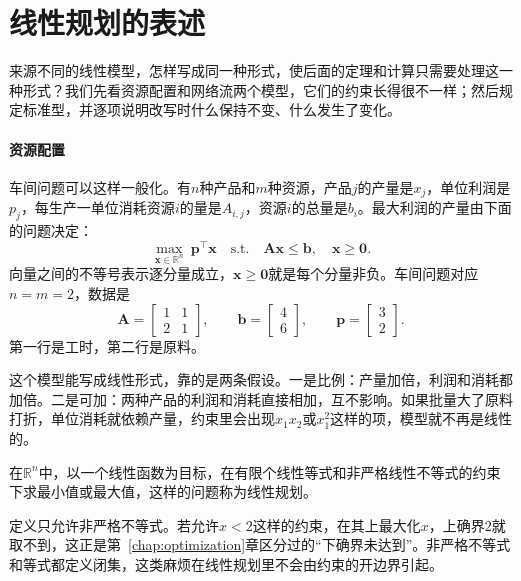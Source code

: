 \section{线性规划的表述}
\label{sec:lp-formulation}

来源不同的线性模型，怎样写成同一种形式，使后面的定理和计算只需要处理这一种形式？我们先看资源配置和网络流两个模型，它们的约束长得很不一样；然后规定标准型，并逐项说明改写时什么保持不变、什么发生了变化。

\paragraph{资源配置}
车间问题可以这样一般化。有$n$种产品和$m$种资源，产品$j$的产量是$x_j$，单位利润是$p_j$，每生产一单位消耗资源$i$的量是$A_{i,j}$，资源$i$的总量是$b_i$。最大利润的产量由下面的问题决定：
\begin{equation}
 \max_{\bm{x}\in\mathbb{R}^n}\ \bm{p}^\top\bm{x}
 \quad\text{s.t.}\quad \bm{A}\bm{x}\leq\bm{b},\quad \bm{x}\geq\bm{0}.
 \label{eq:lp-resource-general}
\end{equation}
向量之间的不等号表示逐分量成立，$\bm{x}\geq\bm{0}$就是每个分量非负。车间问题对应$n=m=2$，数据是
\begin{equation}
 \bm{A}=\begin{bmatrix}1&1\\2&1\end{bmatrix},\qquad
 \bm{b}=\begin{bmatrix}4\\6\end{bmatrix},\qquad
 \bm{p}=\begin{bmatrix}3\\2\end{bmatrix}.
 \label{eq:lp-workshop-inequality}
\end{equation}
第一行是工时，第二行是原料。

这个模型能写成线性形式，靠的是两条假设。一是比例：产量加倍，利润和消耗都加倍。二是可加：两种产品的利润和消耗直接相加，互不影响。如果批量大了原料打折，单位消耗就依赖产量，约束里会出现$x_1x_2$或$x_1^2$这样的项，模型就不再是线性的。

\begin{definition}[线性规划]
 \label{def:lp-program}
 在$\mathbb{R}^n$中，以一个线性函数为目标，在有限个线性等式和非严格线性不等式的约束下求最小值或最大值，这样的问题称为线性规划。
\end{definition}

定义只允许非严格不等式。若允许$x<2$这样的约束，在其上最大化$x$，上确界$2$就取不到，这正是第~\ref{chap:optimization}章区分过的“下确界未达到”。非严格不等式和等式都定义闭集，这类麻烦在线性规划里不会由约束的开边界引起。

